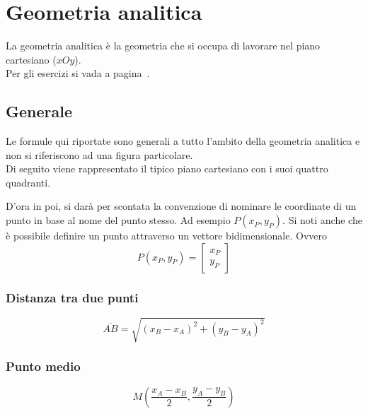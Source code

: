 
\section{Geometria analitica}\label{sec:geomanal}
La geometria analitica è la geometria che si occupa di lavorare nel piano cartesiano ($xOy$).\\
Per gli esercizi si vada a pagina~\pageref{ex:geomanal}.

\subsection{Generale}
Le formule qui riportate sono generali a tutto l'ambito della geometria analitica e non si riferiscono
ad una figura particolare.\\
Di seguito viene rappresentato il tipico piano cartesiano con i suoi quattro quadranti.
\begin{center}
\end{center}
D'ora in poi, si darà per scontata la convenzione di nominare le coordinate di un punto in base al nome
del punto stesso. Ad esempio $P(x_P, y_P)$. Si noti anche che è possibile definire un punto attraverso
un vettore bidimensionale. Ovvero
\begin{equation*}
  P(x_P,y_P) = \begin{bmatrix}
    x_P\\y_P
  \end{bmatrix}
\end{equation*}

\subsubsection{Distanza tra due punti}
\begin{equation*}
  \overline{AB} = \sqrt{(x_B-x_A)^2+(y_B-y_A)^2}
\end{equation*}

\subsubsection{Punto medio}
\begin{equation*}
  M\left(\frac{x_A-x_B}{2}, \frac{y_A-y_B}{2}\right)
\end{equation*}

